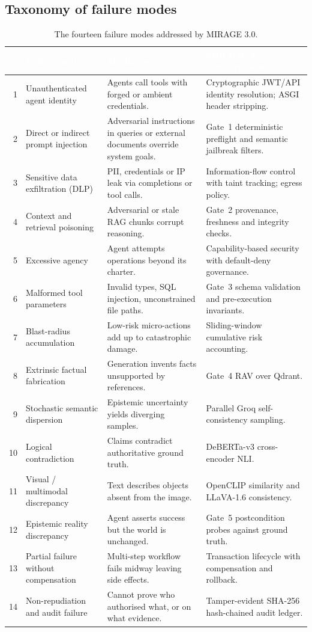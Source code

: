 \documentclass[11pt,a4paper]{article}
\newcommand{\hc}[1]{\textcolor{white}{\textbf{#1}}}
\newcommand{\hdrrow}{\rowcolor{primarynavy}}
\begin{document}
\subsection{Taxonomy of failure modes}
\begin{table}[!htbp]
\centering\small
\renewcommand{\arraystretch}{1.2}
\begin{tabularx}{\linewidth}{@{}r L{3.2cm} L{4.5cm} Y@{}}
\hdrrow \hc{\#} & \hc{Failure mode} & \hc{Mechanism} & \hc{MIRAGE 3.0 countermeasure}\\
 & Unauthenticated agent identity & Agents call tools with forged or ambient credentials. & Cryptographic JWT/API identity resolution; ASGI header stripping.\\
2 & Direct or indirect prompt injection & Adversarial instructions in queries or external documents override system goals. & Gate~1 deterministic preflight and semantic jailbreak filters.\\
3 & Sensitive data exfiltration (DLP) & PII, credentials or IP leak via completions or tool calls. & Information-flow control with taint tracking; egress policy.\\
4 & Context and retrieval poisoning & Adversarial or stale RAG chunks corrupt reasoning. & Gate~2 provenance, freshness and integrity checks.\\
5 & Excessive agency & Agent attempts operations beyond its charter. & Capability-based security with default-deny governance.\\
6 & Malformed tool parameters & Invalid types, SQL injection, unconstrained file paths. & Gate~3 schema validation and pre-execution invariants.\\
7 & Blast-radius accumulation & Low-risk micro-actions add up to catastrophic damage. & Sliding-window cumulative risk accounting.\\
8 & Extrinsic factual fabrication & Generation invents facts unsupported by references. & Gate~4 RAV over Qdrant.\\
9 & Stochastic semantic dispersion & Epistemic uncertainty yields diverging samples. & Parallel Groq self-consistency sampling.\\
10 & Logical contradiction & Claims contradict authoritative ground truth. & DeBERTa-v3 cross-encoder NLI.\\
11 & Visual / multimodal discrepancy & Text describes objects absent from the image. & OpenCLIP similarity and LLaVA-1.6 consistency.\\
12 & Epistemic reality discrepancy & Agent asserts success but the world is unchanged. & Gate~5 postcondition probes against ground truth.\\
13 & Partial failure without compensation & Multi-step workflow fails midway leaving side effects. & Transaction lifecycle with compensation and rollback.\\
14 & Non-repudiation and audit failure & Cannot prove who authorised what, or on what evidence. & Tamper-evident SHA-256 hash-chained audit ledger.\\
\bottomrule
\end{tabularx}
\caption{The fourteen failure modes addressed by MIRAGE 3.0.}
\label{tab:14_failures}
\end{table}
\end{document}
